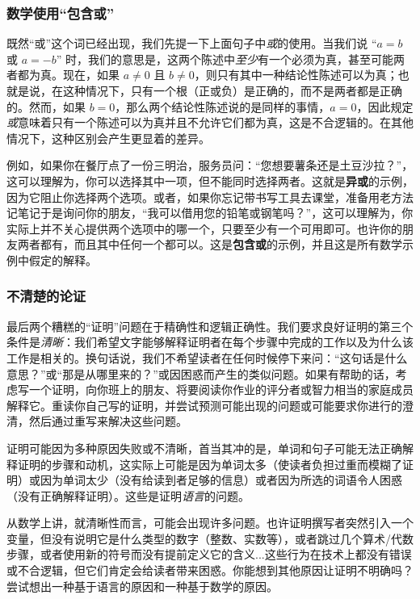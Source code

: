 \subsubsection*{数学使用“包含或”}

既然“或”这个词已经出现，我们先提一下上面句子中\textit{或}的使用。当我们说 “$a = b$ 或 $a = -b$” 时，我们的意思是，这两个陈述中\textit{至少}有一个必须为真，甚至可能两者都为真。现在，如果 $a \ne 0$ 且 $b \ne 0$，则只有其中一种结论性陈述可以为真；也就是说，在这种情况下，只有一个根（正或负）是正确的，而不是两者都是正确的。然而，如果 $b = 0$，那么两个结论性陈述说的是同样的事情，$a = 0$，因此规定\textit{或}意味着只有一个陈述可以为真并且不允许它们都为真，这是不合逻辑的。在其他情况下，这种区别会产生更显着的差异。

例如，如果你在餐厅点了一份三明治，服务员问：“您想要薯条还是土豆沙拉？”，这可以理解为，你可以选择其中一项，但不能同时选择两者。这就是\textbf{异或}的示例，因为它阻止你选择两个选项。或者，如果你忘记带书写工具去课堂，准备用老方法记笔记于是询问你的朋友，“我可以借用您的铅笔或钢笔吗？”，这可以理解为，你实际上并不关心提供两个选项中的哪一个，只要至少有一个可用即可。也许你的朋友两者都有，而且其中任何一个都可以。这是\textbf{包含或}的示例，并且这是所有数学示例中假定的解释。

\subsubsection*{不清楚的论证}

最后两个糟糕的“证明”问题在于精确性和逻辑正确性。我们要求良好证明的第三个条件是\textit{清晰}：我们希望文字能够解释证明者在每个步骤中完成的工作以及为什么该工作是相关的。换句话说，我们不希望读者在任何时候停下来问：“这句话是什么意思？”或“那是从哪里来的？”或因困惑而产生的类似问题。如果有帮助的话，考虑写一个证明，向你班上的朋友、将要阅读你作业的评分者或智力相当的家庭成员解释它。重读你自己写的证明，并尝试预测可能出现的问题或可能要求你进行的澄清，然后通过重写来解决这些问题。

证明可能因为多种原因失败或不清晰，首当其冲的是，单词和句子可能无法正确解释证明的步骤和动机，这实际上可能是因为单词太多（使读者负担过重而模糊了证明）或因为单词太少（没有给读到者足够的信息）或者因为所选的词语令人困惑（没有正确解释证明）。这些是证明\textit{语言}的问题。

从数学上讲，就清晰性而言，可能会出现许多问题。也许证明撰写者突然引入一个变量，但没有说明它是什么类型的数字（整数、实数等），或者跳过几个算术/代数步骤，或者使用新的符号而没有提前定义它的含义...这些行为在技术上都没有错误或不合逻辑，但它们肯定会给读者带来困惑。你能想到其他原因让证明不明确吗？尝试想出一种基于语言的原因和一种基于数学的原因。

